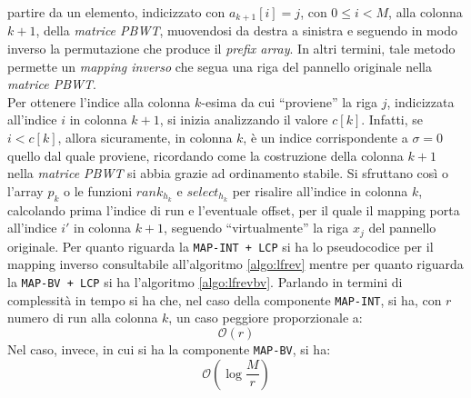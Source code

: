 partire da un elemento, indicizzato con $a_{k+1}[i]=j$, con $0\leq i<M$, alla
colonna $k+1$, della 
\textit{matrice PBWT}, muovendosi da destra a sinistra e seguendo in modo
inverso la permutazione che produce il \textit{prefix array}. In altri termini,
tale metodo permette un \textit{mapping inverso} che segua una riga del
pannello originale nella \textit{matrice PBWT}.\\ 
Per ottenere l'indice alla colonna $k$-esima da cui ``proviene'' la riga $j$,
indicizzata all'indice $i$ in
colonna $k+1$, si inizia analizzando il valore $c[k]$. Infatti, se $i<c[k]$,
allora sicuramente, in colonna $k$, è un indice corrispondente a $\sigma=0$
quello dal quale proviene, ricordando come la costruzione della colonna $k+1$
nella \textit{matrice PBWT} si abbia grazie ad ordinamento stabile. Si sfruttano
così o l'array $p_k$ o le funzioni 
$rank_{h_k}$ e $select_{h_k}$ per risalire all'indice in colonna $k$, calcolando
prima l'indice di run e l'eventuale offset, per il quale il mapping porta
all'indice $i'$ in colonna $k+1$, seguendo ``virtualmente'' la riga $x_j$ del
pannello originale. 
Per quanto riguarda la \texttt{MAP-INT + LCP} si ha lo pseudocodice per il
mapping inverso consultabile all'algoritmo \ref{algo:lfrev} mentre per quanto
riguarda la \texttt{MAP-BV + LCP} si ha l'algoritmo
\ref{algo:lfrevbv}. Parlando in termini di complessità in tempo si ha che, nel
caso della componente \texttt{MAP-INT}, si ha, con $r$ numero di run alla
colonna $k$, un caso peggiore proporzionale a:
\begin{equation}
  \label{eq:revint}
  \mathcal{O}(r)
\end{equation}
Nel caso, invece, in cui si ha la componente \texttt{MAP-BV}, si ha:
\begin{equation}
  \label{eq:revbv}
  \mathcal{O}\left(\log\frac{M}{r}\right)
\end{equation}
